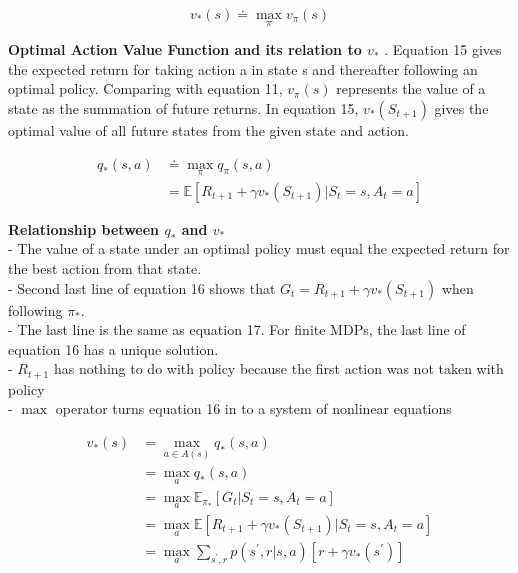 \documentclass{article}
\begin{document}
\begin{equation}
v_{*}(s) \doteq \max _{\pi} v_{\pi}(s)
\end{equation}

\noindent
\textbf{Optimal Action Value Function and its relation to $v_{*}$}
. Equation 15 gives the expected return for taking action a in state s and
thereafter following an optimal policy. Comparing with equation 11, $v_{\pi}(s)$
represents the value of a state as the summation of future returns. In equation
15, $v_{*}\left(S_{t+1}\right)$ gives the optimal value of all future states
from the given state and action.

\begin{equation}
\begin{aligned}
q_{*}(s, a) &\doteq \max _{\pi} q_{\pi}(s, a)\\
&= \mathbb{E}\left[R_{t+1}+\gamma v_{*}\left(S_{t+1}\right) | S_{t}=s, A_{t}=a\right]
\end{aligned}
\end{equation}

\noindent
\textbf{Relationship between $q_{*}$ and $v_{*}$}\\
- The value of a state under an optimal policy must equal the expected return
for the best action from that state. \\
- Second last line of equation 16 shows that $G_{t} = R_{t+1} + \gamma
v_{*}(S_{t+1})$ when following $\pi_{*}$. \\
- The last line is the same as equation 17. For finite MDPs, the last line of
equation 16 has a unique solution.\\
- $R_{t+1}$ has nothing to do with policy because the first action was not taken
with policy\\
- $\max$ operator turns equation 16 in to a system of nonlinear equations

\begin{equation}
\begin{aligned}
v_{*}(s) &=\max _{a \in A(s)} q_{*}(s, a)\\
&= \max _{a} q_{*}(s, a)\\
&= \max _{a} \mathbb{E}_{\pi_{*}}[G_{t} | S_{t} = s, A_{t} = a]\\
&= \max _{a} \mathbb{E}[R_{t+1} + \gamma v_{*}(S_{t+1}) | S_{t} = s, A_{t} = a]\\
&= \max _{a} \sum_{s^{\prime}, r} p(s^{\prime}, r | s, a)[r + \gamma v_{*}(s^{\prime})]
\end{aligned}
\end{equation}
\end{document}
